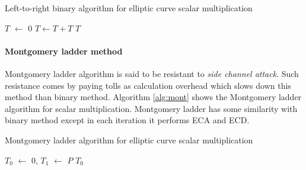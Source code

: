 \begin{algorithm}[H]
	\caption{Left-to-right binary algorithm for elliptic curve scalar multiplication}
	\label{alg:bin}
	\DontPrintSemicolon
	\hspace{-3ex}
	\;
	\hspace{-3ex}
	 \;%
	\nl $T$ $ \leftarrow$ $0$ \;
	\nl {} {\;
		\nl		$T \leftarrow T  + T$\;
		\nl    {} }\;
	\nl {} $T$\;
\end{algorithm}

\paragraph{Montgomery ladder method}
Montgomery ladder algorithm is said to be resistant to \textit{side channel attack}. Such resistance comes by paying tolls as calculation overhead which slows down this method than binary method. Algorithm \ref{alg:mont} shows the Montgomery ladder algorithm for scalar multiplication. Montgomery ladder has some similarity with binary method except in each iteration it performs ECA and ECD. 

\begin{algorithm}[H]
	\caption{Montgomery ladder algorithm for elliptic curve scalar multiplication}
	\label{alg:mont}
	\DontPrintSemicolon
	\hspace{-3ex}
	\;
	\hspace{-3ex}
	 \;%
	\nl $T_0$ $ \leftarrow$ $0$, $T_1$ $\leftarrow$ $P$ \;
	\nl {} {\;
		\nl  {}
	}\;
	\nl {} $T_0$\;
\end{algorithm}


